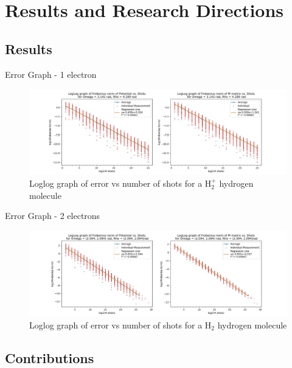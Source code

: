 \documentclass[professionalfonts]{beamer}
\begin{document}
\section{\textbf{Results and Research Directions}}

\subsection{\textbf{Results}}

\begin{frame}{Error Graph - 1 electron}
\begin{figure}[b]
	\centering
	\includegraphics[width=\textwidth]{../img/1e.jpg}
  \caption{Loglog graph of error vs number of shots for a $\text{H}_2^+$ hydrogen molecule}
  \label{fig:1derrorgraph}
\end{figure}
\end{frame}

\begin{frame}{Error Graph - 2 electrons}
\begin{figure}[b]
	\centering
	\includegraphics[width=\textwidth]{../img/2e-nonint.jpg}
  \caption{Loglog graph of error vs number of shots for a $\text{H}_2$ hydrogen molecule}
  \label{fig:2derrorgraph}
\end{figure}
\end{frame}

\subsection{\textbf{Contributions}}
\end{document}
